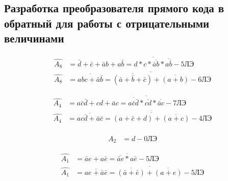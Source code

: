 \documentclass[a4paper,14pt]{article}
\begin{document}
\subsection{Разработка преобразователя прямого кода в обратный для работы с отрицательными величинами}

\begin{equation*}
\begin{aligned}
\widehat{A_8} &= \bar{d} + \bar{c} + \bar{a}b + a\bar{b} = \overline{d*c*\overline{\bar{a}b}*\overline{a\bar{b}}} - \text{5ЛЭ} \\
\widehat{A_8} &= \overline{abc+\bar{a}\bar{b}} = \overline{\overline{(\bar{a}+\bar{b}+\bar{c})}+\overline{(a+b)}} - \text{6ЛЭ}
\end{aligned}
\end{equation*}

\begin{equation*}
\begin{aligned}
\widehat{A_4} &= a\bar{c}\bar{d} + cd + \bar{a}c = \overline{\overline{a\bar{c}\bar{d}}*\overline{cd}*\overline{\bar{a}c}} - \text{7ЛЭ} \\
\widehat{A_4} &= \overline{ac\bar{d} + \bar{a}\bar{c}}  = 
\overline{\overline{(a+\bar{c}+d)+\overline{(a+c)}}}- \text{4ЛЭ}
\end{aligned}
\end{equation*}

\begin{equation*}
\begin{aligned}
\widehat{A_2} &= d - \text{0ЛЭ}
\end{aligned}
\end{equation*}

\begin{equation*}
\begin{aligned}
\widehat{A_1} &= \bar{a}e + a\bar{e} = \overline{\overline{\bar{a}e}*a\bar{e}} - \text{5ЛЭ} \\
\widehat{A_1} &= \overline{ae+\bar{a}\bar{e}} = \overline{\overline{(\bar{a}+\bar{e})}+\overline{(a+e)}} - \text{5ЛЭ}
\end{aligned}
\end{equation*}
\end{document}
